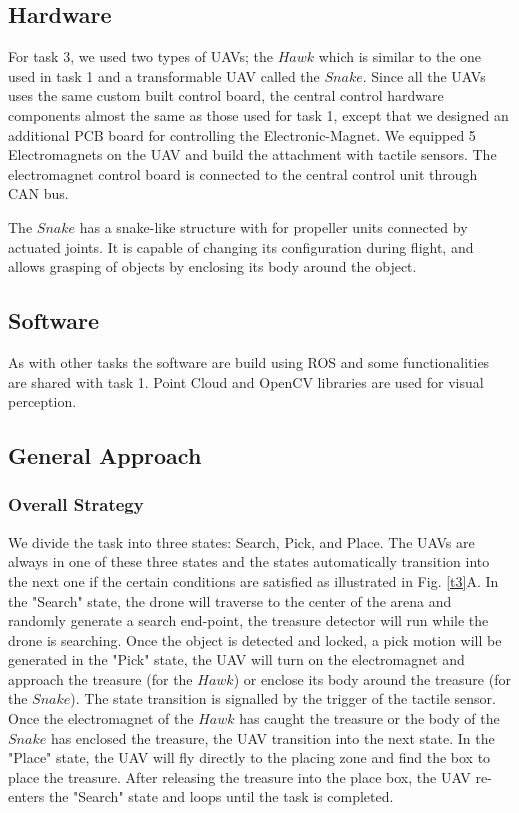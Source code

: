 \documentclass{standalone}
\begin{document}
\subsection{Hardware}
For task 3, we used two types of UAVs; the $Hawk$ which is similar to the one used in task 1 and a transformable UAV called the $Snake$.
Since all the UAVs uses the same custom built control board, the central control hardware components almost the same as those used for task 1, except that we designed an additional PCB board for controlling the Electronic-Magnet. We equipped 5 Electromagnets on the UAV and build the attachment with tactile sensors. The electromagnet control board is connected to the central control unit through CAN bus.

The $Snake$ has a snake-like structure with for propeller units connected by actuated joints. It is capable of changing its configuration during flight, and allows grasping of objects by enclosing its body around the object. 

\subsection{Software}
As with other tasks the software are build using ROS and some functionalities are shared with task 1. Point Cloud and OpenCV libraries are used for visual perception. %

\subsection{General Approach}
\subsubsection{Overall Strategy}
We divide the task into three states: Search, Pick, and Place. The UAVs are always in one of these three states and the states automatically transition into the next one if the certain conditions are satisfied as illustrated in Fig. \ref{t3}A. In the "Search" state, the drone will traverse to the center of the arena and randomly generate a search end-point, the treasure detector will run while the drone is searching. Once the object is detected and locked, a pick motion will be generated in the "Pick" state, the UAV will turn on the electromagnet and approach the treasure (for the $Hawk$) or enclose its body around the treasure (for the $Snake$). The state transition is signalled by the trigger of the tactile sensor. Once the electromagnet of the $Hawk$ has caught the treasure or the body of the $Snake$ has enclosed the treasure, the UAV transition into the next state. In the "Place" state, the UAV will fly directly to the placing zone and find the box to place the treasure. After releasing the treasure into the place box, the UAV re-enters the "Search" state and loops until the task is completed.
\end{document}
